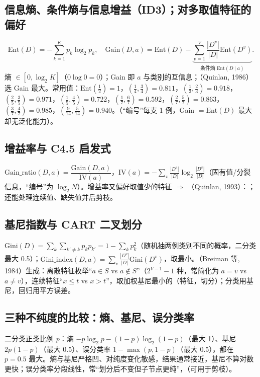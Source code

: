 \subsection{信息熵、条件熵与信息增益（ID3）；对多取值特征的偏好}
\[
\mathrm{Ent}(D)=-\sum_{k=1}^Kp_k\log_2p_k,\quad
\mathrm{Gain}(D,a)=\mathrm{Ent}(D)-\underbrace{\sum_{v=1}^V\frac{|D^v|}{|D|}\mathrm{Ent}(D^v)}_{\text{条件熵 }\mathrm{Ent}(D\mid a)}.
\]
熵 $\in[0,\log_2K]$（$0\log0=0$）；Gain 即 $a$ 与类别的互信息；（Quinlan, 1986）选 Gain 最大。常用值：$\mathrm{Ent}(\frac12)=1$，$(\frac14,\frac34)=0.811$，$(\frac13,\frac23)=0.918$，$(\frac25,\frac35)=0.971$，$(\frac15,\frac45)=0.722$，$(\frac17,\frac67)=0.592$，$(\frac27,\frac57)=0.863$，$(\frac37,\frac47)=0.985$，$(\frac9{14},\frac5{14})=0.940$。（“编号”每支 1 例，Gain $=\mathrm{Ent}(D)$ 最大却无泛化能力）。

\subsection{增益率与 C4.5 启发式}
$\mathrm{Gain\_ratio}(D,a)=\dfrac{\mathrm{Gain}(D,a)}{\mathrm{IV}(a)}$，$\mathrm{IV}(a)=-\sum_v\frac{|D^v|}{|D|}\log_2\frac{|D^v|}{|D|}$（固有值/分裂信息，“编号”为 $\log_2N$）。增益率又偏好取值少的特征 $\Rightarrow$ （Quinlan, 1993）：；还能处理连续值、缺失值并后剪枝。

\subsection{基尼指数与 CART 二叉划分}
$\mathrm{Gini}(D)=\sum_k\sum_{k'\ne k}p_kp_{k'}=1-\sum_kp_k^2$（随机抽两例类别不同的概率，二分类最大 0.5）；$\mathrm{Gini\_index}(D,a)=\sum_v\frac{|D^v|}{|D|}\mathrm{Gini}(D^v)$，取最小。（Breiman 等, 1984）生成：离散特征枚举“$a\in S$ vs $a\notin S$”（$2^{V-1}-1$ 种，常简化为 $a=v$ vs $a\ne v$），连续特征“$x\le t$ vs $x>t$”，取加权基尼最小的（特征，切分）；分类用基尼，回归用平方误差。

\subsection{三种不纯度的比较：熵、基尼、误分类率}
二分类正类比例 $p$：熵 $-p\log_2p-(1-p)\log_2(1-p)$（最大 1）、基尼 $2p(1-p)$（最大 0.5）、误分类率 $1-\max(p,1-p)$（最大 0.5），都在 $p=0.5$ 最大。熵与基尼严格凹、对纯度变化敏感，结果通常接近，基尼不算对数更快；误分类率分段线性，常“划分后不变但子节点更纯”，（可用于剪枝）。

